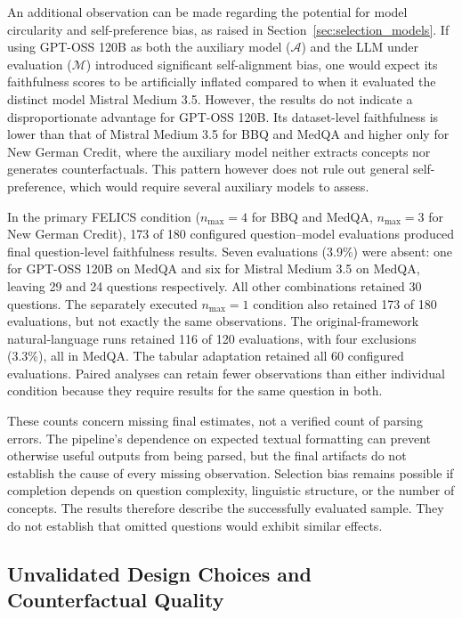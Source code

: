 An additional observation can be made regarding the potential for model circularity and self-preference bias, as raised in Section~\ref{sec:selection_models}. If using GPT-OSS 120B as both the auxiliary model ($\mathcal{A}$) and the LLM under evaluation ($\mathcal{M}$) introduced significant self-alignment bias, one would expect its faithfulness scores to be artificially inflated compared to when it evaluated the distinct model Mistral Medium 3.5. However, the results do not indicate a disproportionate advantage for GPT-OSS 120B. Its dataset-level faithfulness is lower than that of Mistral Medium 3.5 for BBQ and MedQA and higher only for New German Credit, where the auxiliary model neither extracts concepts nor generates counterfactuals. This pattern however does not rule out general self-preference, which would require several auxiliary models to assess.

In the primary FELICS condition ($n_{\max}=4$ for BBQ and MedQA, $n_{\max}=3$ for New German Credit), 173 of 180 configured question--model evaluations produced final question-level faithfulness results. Seven evaluations (3.9\%) were absent: one for GPT-OSS 120B on MedQA and six for Mistral Medium 3.5 on MedQA, leaving 29 and 24 questions respectively. All other combinations retained 30 questions. The separately executed $n_{\max}=1$ condition also retained 173 of 180 evaluations, but not exactly the same observations. The original-framework natural-language runs retained 116 of 120 evaluations, with four exclusions (3.3\%), all in MedQA. The tabular adaptation retained all 60 configured evaluations. Paired analyses can retain fewer observations than either individual condition because they require results for the same question in both.

These counts concern missing final estimates, not a verified count of parsing errors. The pipeline's dependence on expected textual formatting can prevent otherwise useful outputs from being parsed, but the final artifacts do not establish the cause of every missing observation. Selection bias remains possible if completion depends on question complexity, linguistic structure, or the number of concepts. The results therefore describe the successfully evaluated sample. They do not establish that omitted questions would exhibit similar effects.

\subsection{Unvalidated Design Choices and Counterfactual Quality}

